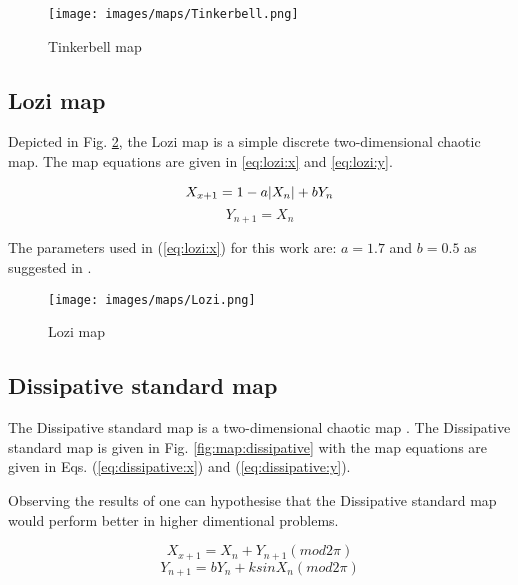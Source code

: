\documentclass[conference]{IEEEtran}
\begin{document}
    \begin{figure}[htbp]
\centerline{\texttt{[image: images/maps/Tinkerbell.png]}}
\caption{Tinkerbell map}
\label{fig:map:tinkerbell}
\end{figure}
	
	\subsection{Lozi map}
	Depicted in Fig. \ref{fig:map:lozi}, the Lozi map is a simple discrete two-dimensional chaotic map. The map equations are given in \ref{eq:lozi:x} and \ref{eq:lozi:y}.
	
	\begin{equation} \label{eq:lozi:x}
	X_{x+1} = 1 - a \abs{X_n} + bY_n
	\end{equation}
	\begin{equation} \label{eq:lozi:y}
	Y_{n+1} = X_n
	\end{equation}

	\noindent The parameters used in (\ref{eq:lozi:x}) for this work are: $ a = 1.7 $ and $ b = 0.5 $ as suggested in \cite{pluhacek:cpso-cprng-imp}.
	\vspace{5mm}
	
	\begin{figure}[htbp]
\centerline{\texttt{[image: images/maps/Lozi.png]}}
\caption{Lozi map}
\label{fig:map:lozi}
\end{figure}
	
	\subsection{Dissipative standard map}
	
	The Dissipative standard map is a two-dimensional chaotic map \cite{pluhacek:cpso-cprng-imp}. The Dissipative standard map is given in Fig. \ref{fig:map:dissipative} with the map equations are given in Eqs. (\ref{eq:dissipative:x}) and (\ref{eq:dissipative:y}).

    Observing the results of \cite{pluhacek:cpso-iw} one can hypothesise that the Dissipative standard map would perform better in higher dimentional problems.
	
	\begin{equation} \label{eq:dissipative:x}
	X_{x+1} = X_n + Y_{n+1} (mod 2\pi)
	\end{equation}
	\begin{equation} \label{eq:dissipative:y}
	Y_{n+1} = bY_n + k sin X_n (mod 2\pi)
	\end{equation}
\end{document}
